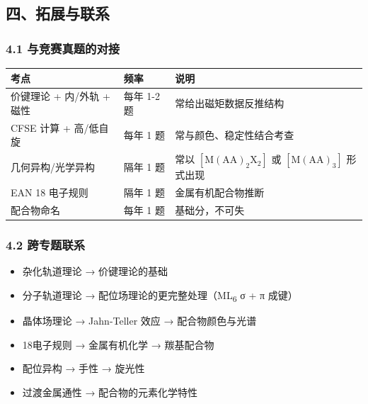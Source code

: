 \documentclass[a4paper,11pt]{ctexart}
\providecommand{\tightlist}{\setlength{\itemsep}{0pt}\setlength{\parskip}{0pt}}
\newcounter{none}
\begin{document}
\subsection{四、拓展与联系}\label{ux56dbux62d3ux5c55ux4e0eux8054ux7cfb}

\subsubsection{4.1 与竞赛真题的对接}\label{ux4e0eux7adeux8d5bux771fux9898ux7684ux5bf9ux63a5}

{\def\LTcaptype{none} %
\begin{longtable}[]{@{}
  >{\raggedright\arraybackslash}p{}
  >{\centering\arraybackslash}p{}
  >{\raggedright\arraybackslash}p{}@{}}
\toprule\noalign{}
\begin{minipage}[b]{\linewidth}\raggedright
考点
\end{minipage} & \begin{minipage}[b]{\linewidth}\centering
频率
\end{minipage} & \begin{minipage}[b]{\linewidth}\raggedright
说明
\end{minipage} \\
\midrule\noalign{}
\endhead
\bottomrule\noalign{}
\endlastfoot
价键理论 + 内/外轨 + 磁性 & 每年 1-2 题 & 常给出磁矩数据反推结构 \\
CFSE 计算 + 高/低自旋 & 每年 1 题 & 常与颜色、稳定性结合考查 \\
几何异构/光学异构 & 隔年 1 题 & 常以 \([\mathrm{M(AA)_2X_2}]\) 或 \([\mathrm{M(AA)_3}]\) 形式出现 \\
EAN 18 电子规则 & 隔年 1 题 & 金属有机配合物推断 \\
配合物命名 & 每年 1 题 & 基础分，不可失 \\
\end{longtable}
}

\subsubsection{4.2 跨专题联系}\label{ux8de8ux4e13ux9898ux8054ux7cfb}

\begin{itemize}
\tightlist
\item
  杂化轨道理论 → 价键理论的基础
\item
  分子轨道理论 → 配位场理论的更完整处理（ML\textsubscript{6} σ + π 成键）
\item
  晶体场理论 → Jahn-Teller 效应 → 配合物颜色与光谱
\item
  18电子规则 → 金属有机化学 → 羰基配合物
\item
  配位异构 → 手性 → 旋光性
\item
  过渡金属通性 → 配合物的元素化学特性
\end{itemize}
\end{document}
